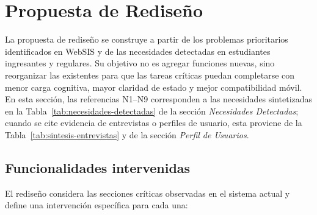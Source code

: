 \section{Propuesta de Rediseño}

La propuesta de rediseño se construye a partir de los problemas prioritarios identificados en WebSIS y de las necesidades detectadas en estudiantes ingresantes y regulares. Su objetivo no es agregar funciones nuevas, sino reorganizar las existentes para que las tareas críticas puedan completarse con menor carga cognitiva, mayor claridad de estado y mejor compatibilidad móvil. En esta sección, las referencias N1--N9 corresponden a las necesidades sintetizadas en la Tabla~\ref{tab:necesidades-detectadas} de la sección \textit{Necesidades Detectadas}; cuando se cite evidencia de entrevistas o perfiles de usuario, esta proviene de la Tabla~\ref{tab:sintesis-entrevistas} y de la sección \textit{Perfil de Usuarios}.

\subsection{Funcionalidades intervenidas}

El rediseño considera las secciones críticas observadas en el sistema actual y define una intervención específica para cada una:

